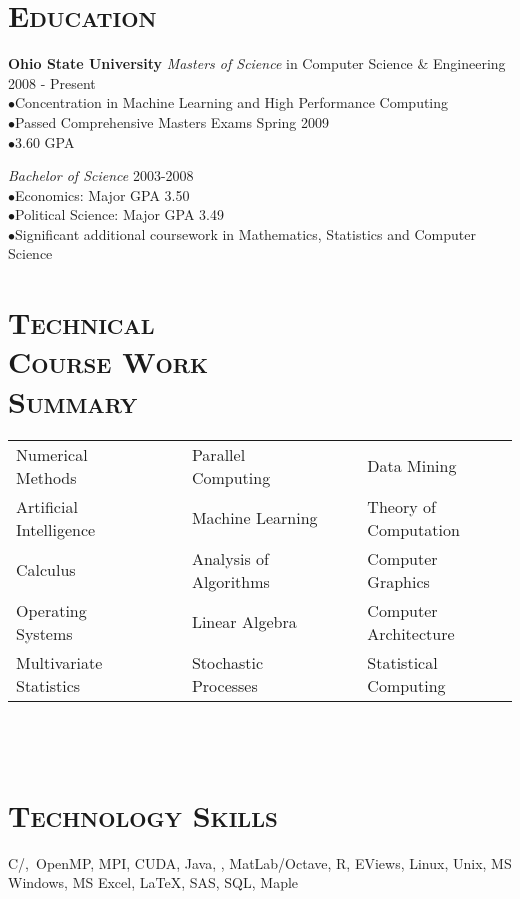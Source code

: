 \begin{resume}

\section{\textsc{Education}}

\textbf{Ohio State University}
\newline
\textit{Masters of Science} in Computer Science \& Engineering \hfill 2008 - Present \\
$\bullet$Concentration in Machine Learning and High Performance Computing\\
$\bullet$Passed Comprehensive Masters Exams Spring 2009 \\
$\bullet$3.60 GPA

\textit{Bachelor of Science} \hfill 2003-2008 \\
$\bullet$Economics: Major GPA 3.50\\
$\bullet$Political Science: Major GPA 3.49 \\
$\bullet$Significant additional coursework in Mathematics, Statistics and Computer Science

\section{\textsc{Technical \\  Course Work \\ Summary}}


\begin{tabular}{lllll}
Numerical Methods      & \ \ & Parallel Computing      & \ \ & Data Mining  \\
Artificial Intelligence   & \ \ & Machine Learning    & \ \ & Theory of Computation \\ 
Calculus     & \ \ & Analysis of Algorithms          & \ \ &  Computer Graphics    \\
Operating Systems      & \ \ & Linear Algebra           & \ \ & Computer Architecture \\
Multivariate Statistics      & \ \ & Stochastic Processes           & \ \ & Statistical Computing  \\
\end{tabular}

\begin{formatb}
  \\
  \body\\
\end{formatb}

\section{\textsc{Technology Skills}}
C/\Cplusplus,\ OpenMP, MPI, CUDA, Java, \CSharp, MatLab/Octave, R, EViews, Linux, Unix, MS Windows, MS Excel, \LaTeX, SAS, SQL, Maple


\end{resume}
